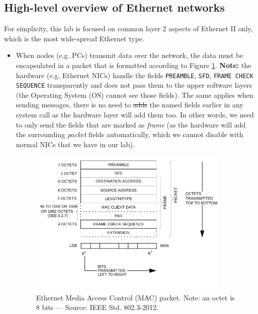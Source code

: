 \documentclass[pdftex,12pt,a4paper]{article}
\providecommand{\DIFadd}[1]{{\protect\color{blue}\uwave{#1}}} %
\providecommand{\DIFdel}[1]{{\protect\color{red}\sout{#1}}}                      %
\providecommand{\DIFaddbegin}{} %
\providecommand{\DIFaddend}{} %
\providecommand{\DIFdelbegin}{} %
\providecommand{\DIFdelend}{} %
\begin{document}
        \subsection{High-level overview of Ethernet networks}
            For simplicity, this lab is focused on common layer 2 aspects of
            Ethernet II only, which is the most wide-spread Ethernet type.
            \begin{itemize}
                \item When nodes (e.g. PCs) transmit data over the network, the
                data must be encapsulated in a packet that is formatted
                according to Figure \ref{fig:macpacket}. \textbf{Note:} the
                hardware (e.g. Ethernet NICs) handle the fields
                \texttt{PREAMBLE}, \texttt{SFD}, \texttt{FRAME CHECK SEQUENCE}
                transparently and does not pass them to the upper software
                layers (the Operating System (OS) cannot see those fields). The
                same applies when sending messages, there is no need to \DIFdelbegin \DIFdel{adds
                }\DIFdelend \DIFaddbegin \DIFadd{add
                }\DIFaddend the named fields earlier in any system call as the hardware
                layer will add them too. In other words, we need to only send
                the fields that are marked as \emph{frame} (as the hardware
                will add the surrounding \emph{packet} fields automatically,
                which we cannot disable with normal NICs that we have in our
                lab).

                \begin{figure}[tbh]
                    \centering
                    \includegraphics[width=0.9\textwidth]{figures/macpacket}
                    \caption{Ethernet Media Access Control (MAC) packet. Note:
                    an octet is 8 bits --- Source: IEEE Std. 802.3-2012.}
                    \label{fig:macpacket}
                \end{figure}


\end{itemize}
\end{document}
